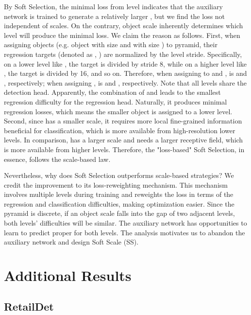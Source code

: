 \documentclass[runningheads]{llncs}
\begin{document}
By Soft Selection, the minimal loss from level  indicates that the auxiliary network is trained to generate a relatively larger , but we find the loss not independent of scales. On the contrary, object scale inherently determines which level will produce the minimal loss. We claim the reason as follows. First, when assigning objects (e.g. object  with size  and  with size ) to pyramid, their regression targets (denoted as , ) are normalized by the level stride. Specifically, on a lower level like , the target is divided by stride 8, while on a higher level like , the target is divided by 16, and so on. Therefore, when assigning  to  and ,  is  and , respectively; when assigning ,  is  and , respectively. Note that all levels share the detection head. Apparently, the combination of  and  leads to the smallest regression difficulty for the regression head. Naturally, it produces minimal regression losses, which means the smaller object is assigned to a lower level. Second, since  has a smaller scale, it requires more local fine-grained information beneficial for classification, which is more available from high-resolution lower levels. In comparison,  has a larger scale and needs a larger receptive field, which is more available from higher levels. Therefore, the "loss-based" Soft Selection, in essence, follows the scale-based law. 

Nevertheless, why does Soft Selection outperforms scale-based strategies? We credit the improvement to its loss-reweighting mechanism. This mechanism involves multiple levels during training and reweights the loss in terms of the regression and classification difficulties, making optimization easier. Since the pyramid is discrete, if an object scale falls into the gap of two adjacent levels, both levels' difficulties will be similar. The auxiliary network has opportunities to learn to predict proper  for both levels. The analysis motivates us to abandon the auxiliary network and design Soft Scale (SS). 


\section{Additional Results}

\subsection{RetailDet}
\end{document}
